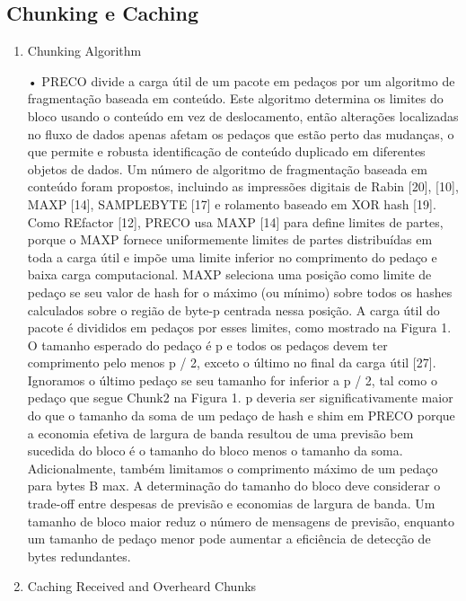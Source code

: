 \documentclass[12pt]{article}
\begin{document}
\subsection{Chunking e Caching}

\begin{enumerate}
	\item Chunking Algorithm
	
	• 
	PRECO divide a carga útil de um
	pacote em pedaços por um algoritmo de fragmentação baseada em conteúdo.
	Este algoritmo determina os limites do bloco usando o conteúdo
	em vez de deslocamento, então alterações localizadas no fluxo de dados apenas
	afetam os pedaços que estão perto das mudanças, o que permite
	e robusta identificação de conteúdo duplicado em diferentes
	objetos de dados. Um número de algoritmo de fragmentação baseada em conteúdo
	foram propostos, incluindo as impressões digitais de Rabin [20], [10],
	MAXP [14], SAMPLEBYTE [17] e rolamento baseado em XOR
	hash [19]. Como REfactor [12], PRECO usa MAXP [14] para
	define limites de partes, porque o MAXP fornece uniformemente
	limites de partes distribuídas em toda a carga útil e impõe uma
	limite inferior no comprimento do pedaço e baixa carga computacional.
	MAXP seleciona uma posição como limite de pedaço se seu valor de hash for
	o máximo (ou mínimo) sobre todos os hashes calculados sobre o
	região de byte-p centrada nessa posição. A carga útil do pacote é
	divididos em pedaços por esses limites, como mostrado na Figura 1.
	O tamanho esperado do pedaço é p e todos os pedaços devem ter comprimento
	pelo menos p / 2, exceto o último no final da carga útil [27].
	Ignoramos o último pedaço se seu tamanho for inferior a p / 2, tal
	como o pedaço que segue Chunk2 na Figura 1. p deveria ser
	significativamente maior do que o tamanho da soma de um pedaço de hash e shim
	em PRECO porque a economia efetiva de largura de banda resultou
	de uma previsão bem sucedida do bloco é o tamanho do bloco menos
	o tamanho da soma. Adicionalmente, também limitamos o comprimento máximo
	de um pedaço para bytes B max. A determinação do tamanho do bloco
	deve considerar o trade-off entre despesas de previsão e
	economias de largura de banda. Um tamanho de bloco maior reduz o número de
	mensagens de previsão, enquanto um tamanho de pedaço menor pode aumentar
	a eficiência de detecção de bytes redundantes.
	
	\item Caching Received and Overheard Chunks
	

\end{enumerate}
\end{document}

